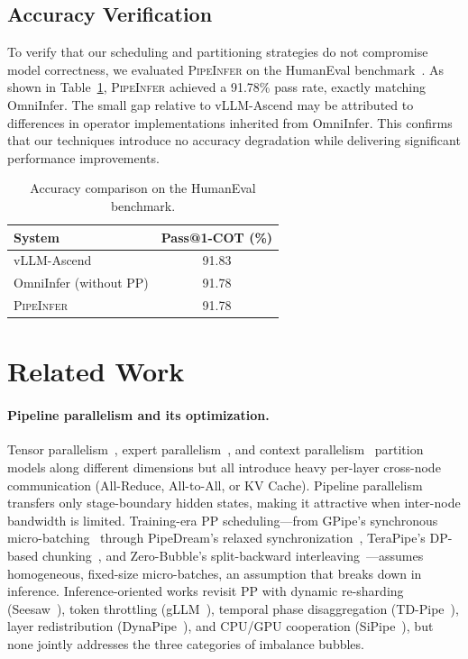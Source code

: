 \documentclass[12pt,a4paper]{article}
\newcommand{\sys}{\textsc{PipeInfer}\xspace}
\newcommand{\humanevalpass}{91.78\%\xspace}
\newcommand{\humanevalpassvalue}{91.78\xspace}
\begin{document}
\subsection{Accuracy Verification}

To verify that our scheduling and partitioning strategies do not compromise model correctness, we evaluated \sys on the HumanEval benchmark~\cite{human-eval}.
As shown in Table~\ref{tab:accuracy}, \sys achieved a \humanevalpass pass rate, exactly matching OmniInfer.
The small gap relative to vLLM-Ascend may be attributed to differences in operator implementations inherited from OmniInfer.
This confirms that our techniques introduce no accuracy degradation while delivering significant performance improvements.

\begin{table}[!htbp]
\centering
\caption{Accuracy comparison on the HumanEval benchmark.}
\label{tab:accuracy}
\begin{tabular}{lc}
\toprule
\textbf{System} & \textbf{Pass@1-COT (\%)} \\
\midrule
vLLM-Ascend & 91.83 \\
OmniInfer (without PP) & \humanevalpassvalue \\
\sys & \humanevalpassvalue \\
\bottomrule
\end{tabular}
\end{table}

\section{Related Work}

\paragraph{Pipeline parallelism and its optimization.}
Tensor parallelism~\cite{megatron}, expert parallelism~\cite{deepseekv3,cloudmatrix384}, and context parallelism~\cite{ringattention,loongserve} partition models along different dimensions but all introduce heavy per-layer cross-node communication (All-Reduce, All-to-All, or KV Cache).
Pipeline parallelism~\cite{gpipe} transfers only stage-boundary hidden states, making it attractive when inter-node bandwidth is limited.
Training-era PP scheduling---from GPipe's synchronous micro-batching~\cite{gpipe} through PipeDream's relaxed synchronization~\cite{pipedream}, TeraPipe's DP-based chunking~\cite{terapipe}, and Zero-Bubble's split-backward interleaving~\cite{zerobubble}---assumes homogeneous, fixed-size micro-batches, an assumption that breaks down in inference.
Inference-oriented works revisit PP with dynamic re-sharding (Seesaw~\cite{seesaw}), token throttling (gLLM~\cite{gllm}), temporal phase disaggregation (TD-Pipe~\cite{tdpipe}), layer redistribution (DynaPipe~\cite{dynapipe}), and CPU/GPU cooperation (SiPipe~\cite{sipipe}), but none jointly addresses the three categories of imbalance bubbles.
\end{document}

